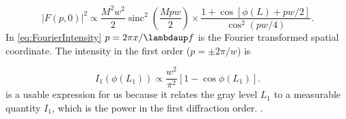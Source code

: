 \begin{equation}\label{eq:FourierIntensity}
    |F(p,0)|^2\propto
    \frac{M^2 w^2}{2}\operatorname{sinc}^2\left(\frac{M p w}{2}\right) \times
    \frac{1 + \cos{\left[\phi(L)+p w/2\right]}}{\cos^2(p w/4)}.
\end{equation}
In \cref{eq:FourierIntensity} $p=2\pi x/\lambdaup f$ is the Fourier transformed spatial coordinate. 
The intensity in the first order ($p=\pm 2\pi/w$) is

\begin{equation}\label{eq:IntensityFirstOrderAppendix}
    I_1(\phi(L_1)) \propto
    \frac{w^2}{\pi^2} \left[ 
    1-\cos{\phi(L_1)}
    \right].
\end{equation}
 is a usable expression for us because it relates the gray level $L_1$ to a measurable quantity $I_1$, which is the power in the first diffraction order. .